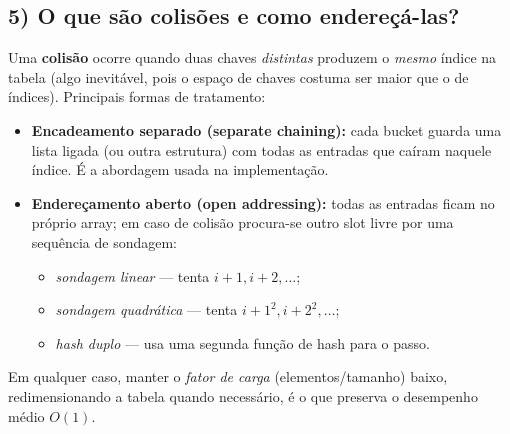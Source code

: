 \documentclass[11pt,a4paper]{article}
\begin{document}
\subsection*{5) O que são colisões e como endereçá-las?}
Uma \textbf{colisão} ocorre quando duas chaves \emph{distintas} produzem o \emph{mesmo} índice na
tabela (algo inevitável, pois o espaço de chaves costuma ser maior que o de índices). Principais
formas de tratamento:
\begin{itemize}[noitemsep]
  \item \textbf{Encadeamento separado (separate chaining):} cada bucket guarda uma lista ligada
        (ou outra estrutura) com todas as entradas que caíram naquele índice. É a abordagem
        usada na implementação.
  \item \textbf{Endereçamento aberto (open addressing):} todas as entradas ficam no próprio
        array; em caso de colisão procura-se outro slot livre por uma sequência de sondagem:
        \begin{itemize}[noitemsep]
          \item \emph{sondagem linear} --- tenta $i+1, i+2, \dots$;
          \item \emph{sondagem quadrática} --- tenta $i+1^2, i+2^2, \dots$;
          \item \emph{hash duplo} --- usa uma segunda função de hash para o passo.
        \end{itemize}
\end{itemize}
Em qualquer caso, manter o \emph{fator de carga} (elementos/tamanho) baixo, redimensionando a
tabela quando necessário, é o que preserva o desempenho médio $O(1)$.
\end{document}
